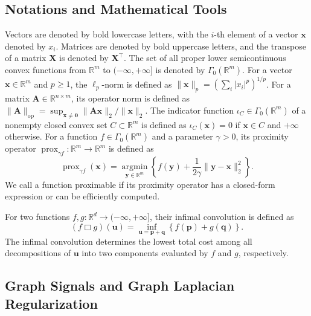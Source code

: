 \subsection{Notations and Mathematical Tools}

Vectors are denoted by bold lowercase letters, with the $i$-th element of a vector $\mathbf{x}$ denoted by $x_i$.
Matrices are denoted by bold uppercase letters, and the transpose of a matrix $\mathbf{X}$ is denoted by $\mathbf{X}^{\top}$.
The set of all proper lower semicontinuous convex functions from $\mathbb{R}^{m}$ to $(-\infty,+\infty]$ is denoted by $\Gamma_{0}(\mathbb{R}^{m})$.
For a vector $\mathbf{x}\in\mathbb{R}^{m}$ and $p\geq 1$, the $\ell_p$-norm is defined as $\|\mathbf{x}\|_{p}=(\sum_i |x_i|^{p})^{1/p}$.
For a matrix $\mathbf{A}\in\mathbb{R}^{n\times m}$, its operator norm is defined as $\|\mathbf{A}\|_{\mathrm{op}}=\sup_{\mathbf{x}\neq\mathbf{0}}\|\mathbf{A}\mathbf{x}\|_2/\|\mathbf{x}\|_2$.
The indicator function $\iota_C\in\Gamma_{0}(\mathbb{R}^{m})$ of a nonempty closed convex set $C\subset\mathbb{R}^{m}$ is defined as $\iota_C(\mathbf{x})=0$ if $\mathbf{x}\in C$ and $+\infty$ otherwise.
For a function $f\in\Gamma_{0}(\mathbb{R}^{m})$ and a parameter $\gamma>0$, its proximity operator $\operatorname{prox}_{\gamma f}:\mathbb{R}^{m}\to\mathbb{R}^{m}$ is defined as
\begin{equation}
\operatorname{prox}_{\gamma f}(\mathbf{x})
=
\operatorname*{argmin}_{\mathbf{y}\in\mathbb{R}^{m}}
\left\{
f(\mathbf{y})
+
\frac{1}{2\gamma}\|\mathbf{y}-\mathbf{x}\|_2^2
\right\}.
\end{equation}
We call a function proximable if its proximity operator has a closed-form expression or can be efficiently computed.

For two   functions $f,g:\mathbb{R}^{d}\to(-\infty,+\infty]$, their infimal convolution \cite{BauschkeCombettes2017} is defined as
\begin{equation}
(f\Box g)(\mathbf{u})
=
\inf_{\mathbf{u}=\mathbf{p}+\mathbf{q}}
\left\{
f(\mathbf{p})+g(\mathbf{q})
\right\}.
\end{equation}
The infimal convolution determines the lowest total cost among all decompositions of $\mathbf{u}$ into two components evaluated by $f$ and $g$, respectively.


\subsection{Graph Signals and Graph Laplacian Regularization}

